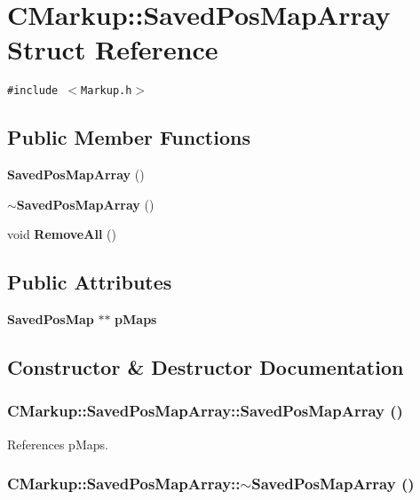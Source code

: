 \section{CMarkup::SavedPosMapArray Struct Reference}
\label{structCMarkup_1_1SavedPosMapArray}
{\tt \#include $<$Markup.h$>$}

\subsection*{Public Member Functions}
\begin{CompactItemize}
\item 
{\bf SavedPosMapArray} ()
\item 
{\bf $\sim$SavedPosMapArray} ()
\item 
void {\bf RemoveAll} ()
\end{CompactItemize}
\subsection*{Public Attributes}
\begin{CompactItemize}
\item 
{\bf SavedPosMap} $\ast$$\ast$ {\bf pMaps}
\end{CompactItemize}


\subsection{Constructor \& Destructor Documentation}
\subsubsection[SavedPosMapArray]{\setlength{\rightskip}{0pt plus 5cm}CMarkup::SavedPosMapArray::SavedPosMapArray ()\hspace{0.3cm}{\tt  [inline]}}\label{structCMarkup_1_1SavedPosMapArray_0fca988b3417d41ccf3e2b3e8fef7483}




References pMaps.
\subsubsection[$\sim$SavedPosMapArray]{\setlength{\rightskip}{0pt plus 5cm}CMarkup::SavedPosMapArray::$\sim$SavedPosMapArray ()\hspace{0.3cm}{\tt  [inline]}}\label{structCMarkup_1_1SavedPosMapArray_6be57f9ebe160aebb464957caa30ddd6}




